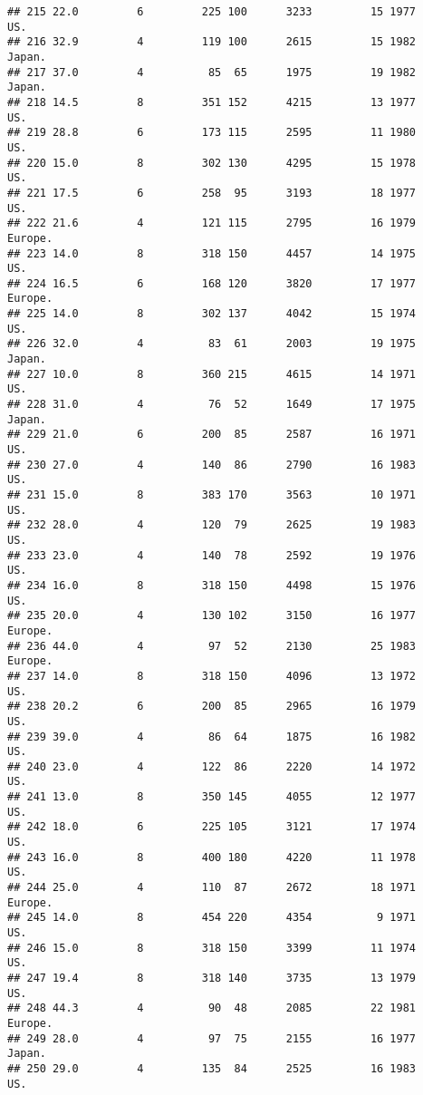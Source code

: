 \documentclass[11pt,]{article}
\begin{document}
\begin{verbatim}
## 215 22.0         6         225 100      3233         15 1977      US.
## 216 32.9         4         119 100      2615         15 1982   Japan.
## 217 37.0         4          85  65      1975         19 1982   Japan.
## 218 14.5         8         351 152      4215         13 1977      US.
## 219 28.8         6         173 115      2595         11 1980      US.
## 220 15.0         8         302 130      4295         15 1978      US.
## 221 17.5         6         258  95      3193         18 1977      US.
## 222 21.6         4         121 115      2795         16 1979  Europe.
## 223 14.0         8         318 150      4457         14 1975      US.
## 224 16.5         6         168 120      3820         17 1977  Europe.
## 225 14.0         8         302 137      4042         15 1974      US.
## 226 32.0         4          83  61      2003         19 1975   Japan.
## 227 10.0         8         360 215      4615         14 1971      US.
## 228 31.0         4          76  52      1649         17 1975   Japan.
## 229 21.0         6         200  85      2587         16 1971      US.
## 230 27.0         4         140  86      2790         16 1983      US.
## 231 15.0         8         383 170      3563         10 1971      US.
## 232 28.0         4         120  79      2625         19 1983      US.
## 233 23.0         4         140  78      2592         19 1976      US.
## 234 16.0         8         318 150      4498         15 1976      US.
## 235 20.0         4         130 102      3150         16 1977  Europe.
## 236 44.0         4          97  52      2130         25 1983  Europe.
## 237 14.0         8         318 150      4096         13 1972      US.
## 238 20.2         6         200  85      2965         16 1979      US.
## 239 39.0         4          86  64      1875         16 1982      US.
## 240 23.0         4         122  86      2220         14 1972      US.
## 241 13.0         8         350 145      4055         12 1977      US.
## 242 18.0         6         225 105      3121         17 1974      US.
## 243 16.0         8         400 180      4220         11 1978      US.
## 244 25.0         4         110  87      2672         18 1971  Europe.
## 245 14.0         8         454 220      4354          9 1971      US.
## 246 15.0         8         318 150      3399         11 1974      US.
## 247 19.4         8         318 140      3735         13 1979      US.
## 248 44.3         4          90  48      2085         22 1981  Europe.
## 249 28.0         4          97  75      2155         16 1977   Japan.
## 250 29.0         4         135  84      2525         16 1983      US.

\end{verbatim}
\end{document}
